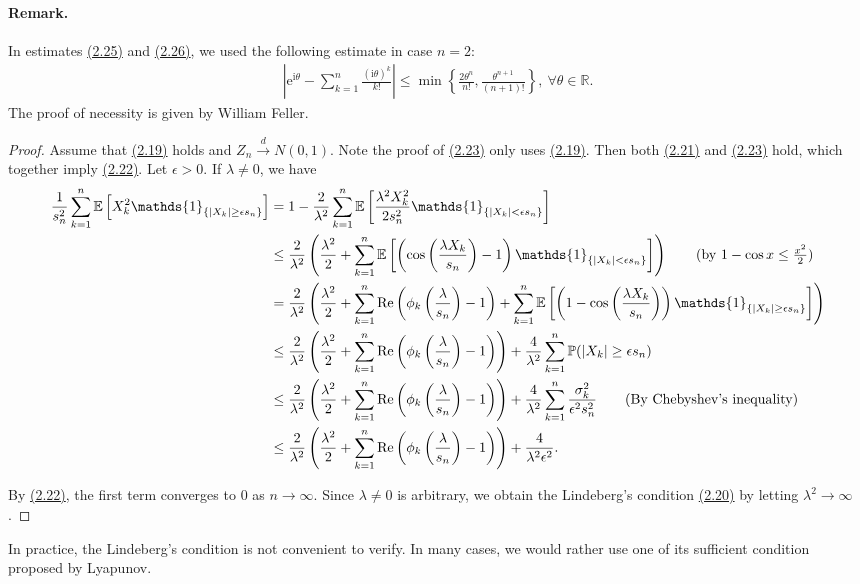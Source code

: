 \documentclass{article}
\numberwithin{equation}{section}
\newcommand{\e}{\mathrm{e}}
\newcommand{\E}{\mathbb{E}}
\renewcommand{\P}{\mathbb{P}}
\renewcommand{\Re}{\mathrm{Re}}
\renewcommand{\i}{\mathrm{i}}
\renewcommand{\proofname}{\textit{Proof}}
\theoremstyle{plain}
\theoremstyle{definition}
\begin{document}
\paragraph{Remark.} In estimates \hyperref[eq:2.25]{(2.25)} and \hyperref[eq:2.26]{(2.26)}, we used the following estimate in case $n=2$:
\begin{align*}
	\left\vert\e^{\i\theta}-\sum_{k=1}^n\frac{(\i\theta)^k}{k!}\right\vert\leq\min\left\{\frac{2\theta^n}{n!},\frac{\theta^{n+1}}{(n+1)!}\right\},\ \forall\theta\in\mathbb{R}.
\end{align*}
The proof of necessity is given by William Feller.
\renewcommand{\proofname}{Proof of Necessity}
\begin{proof}
Assume that \hyperref[eq:2.19]{(2.19)} holds and $Z_n\overset{d}{\to} N(0,1)$. Note the proof of \hyperref[eq:2.23]{(2.23)} only uses \hyperref[eq:2.19]{(2.19)}. Then both \hyperref[eq:2.21]{(2.21)} and \hyperref[eq:2.23]{(2.23)} hold, which together imply \hyperref[eq:2.22]{(2.22)}. Let $\epsilon>0$. If $\lambda\neq 0$, we have
\begin{align*}
\frac{1}{s_n^2}\sum_{k=1}^n\E\left[X_k^2\mathds{1}_{\{\vert X_k\vert\geq\epsilon s_n\}}\right] &= 1 - \frac{2}{\lambda^2}\sum_{k=1}^n\E\left[ \frac{\lambda^2X_k^2}{2s_n^2}\mathds{1}_{\{\vert X_k\vert<\epsilon s_n\}}\right]\\
&\leq \frac{2}{\lambda^2}\left(\frac{\lambda^2}{2} + \sum_{k=1}^n\E\left[ \left(\cos\left(\frac{\lambda X_k}{s_n}\right) - 1\right)\mathds{1}_{\{\vert X_k\vert<\epsilon s_n\}}\right]\right) \tag{by $1-\cos x\leq\frac{x^2}{2}$}\\
&= \frac{2}{\lambda^2}\left(\frac{\lambda^2}{2} +\sum_{k=1}^n\Re\left(\phi_k\left(\frac{\lambda}{s_n}\right) - 1\right) + \sum_{k=1}^n\E\left[\left(1-\cos\left(\frac{\lambda X_k}{s_n}\right)\right)\mathds{1}_{\{\vert X_k\vert\geq\epsilon s_n\}}\right]\right)\\
&\leq \frac{2}{\lambda^2}\left(\frac{\lambda^2}{2} +\sum_{k=1}^n\Re\left(\phi_k\left(\frac{\lambda}{s_n}\right) - 1\right)\right) + \frac{4}{\lambda^2}\sum_{k=1}^n\P(\vert X_k\vert\geq\epsilon s_n)\\
&\leq \frac{2}{\lambda^2}\left(\frac{\lambda^2}{2} +\sum_{k=1}^n\Re\left(\phi_k\left(\frac{\lambda}{s_n}\right) - 1\right)\right) + \frac{4}{\lambda^2}\sum_{k=1}^n\frac{\sigma_k^2}{\epsilon^2s_n^2}\tag{By Chebyshev's inequality}\\
&\leq \frac{2}{\lambda^2}\left(\frac{\lambda^2}{2} +\sum_{k=1}^n\Re\left(\phi_k\left(\frac{\lambda}{s_n}\right) - 1\right)\right) + \frac{4}{\lambda^2\epsilon^2}.
\end{align*}

By \hyperref[eq:2.22]{(2.22)}, the first term converges to $0$ as $n\to\infty$. Since $\lambda\neq 0$ is arbitrary, we obtain the Lindeberg's condition \hyperref[eq:2.20]{(2.20)} by letting $\lambda^2\to\infty$.
\end{proof}
\renewcommand{\proofname}{Proof}
In practice, the Lindeberg's condition is not convenient to verify. In many cases, we would rather use one of its sufficient condition proposed by Lyapunov.
\end{document}
